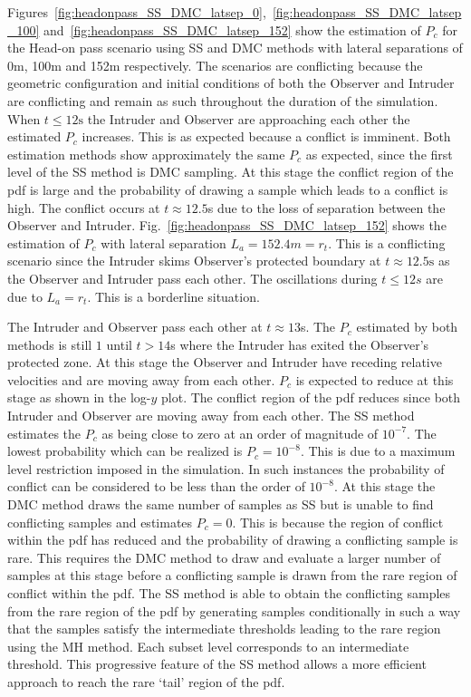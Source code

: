 \documentclass[journal]{IEEEtran}
\begin{document}
Figures~\ref{fig:headonpass_SS_DMC_latsep_0},~\ref{fig:headonpass_SS_DMC_latsep_100} and~\ref{fig:headonpass_SS_DMC_latsep_152} show the estimation of $P_{c}$ for the Head-on pass scenario using SS and DMC methods with lateral separations of 0m, 100m and 152m respectively. The scenarios are conflicting because the geometric configuration and initial conditions of both the Observer and Intruder are conflicting and remain as such throughout the duration of the simulation. When $t \leq 12\text{s}$ the Intruder and Observer are approaching each other the estimated $P_{c}$ increases. This is as expected because a conflict is imminent. Both estimation methods show approximately the same $P_{c}$ as expected, since the first level of the SS method is DMC sampling. At this stage the conflict region of the pdf is large and the probability of drawing a sample which leads to a conflict is high. The conflict occurs at $t \approx 12.5$s due to the loss of separation between the Observer and Intruder. Fig.~\ref{fig:headonpass_SS_DMC_latsep_152} shows the estimation of $P_{c}$ with lateral separation $L_{a} = 152.4m = r_{t}$. This is a conflicting scenario since the Intruder skims Observer's protected boundary at $t \approx 12.5 \text{s}$ as the Observer and Intruder pass each other. The oscillations during $t \leq 12s$ are due to $L_{a} = r_{t}$. This is a borderline situation. 

The Intruder and Observer pass each other at $t \approx 13$s. The $P_{c}$ estimated by both methods is still $1$ until $t > 14$s where the Intruder has exited the Observer's protected zone. At this stage the Observer and Intruder have receding relative velocities and are moving away from each other. $P_{c}$ is expected to reduce at this stage as shown in the log-$y$ plot. The conflict region of the pdf reduces since both Intruder and Observer are moving away from each other. The SS method estimates the $P_{c}$ as being close to zero at an order of magnitude of $10^{-7}$. The lowest probability which can be realized is $P_{c} = 10^{-8}$. This is due to a maximum level restriction imposed in the simulation. In such instances the probability of conflict can be considered to be less than the order of $10^{-8}$. At this stage the DMC method draws the same number of samples as SS but is unable to find conflicting samples and estimates $P_{c} = 0$. This is because the region of conflict within the pdf has reduced and the probability of drawing a conflicting sample is rare. This requires the DMC method to draw and evaluate a larger number of samples at this stage before a conflicting sample is drawn from the rare region of conflict within the pdf. The SS method is able to obtain the conflicting samples from the rare region of the pdf by generating samples conditionally in such a way that the samples satisfy the intermediate thresholds leading to the rare region using the MH method. Each subset level corresponds to an intermediate threshold.  This progressive feature of the SS method allows a more efficient approach to reach the rare `tail' region of the pdf.
\end{document}
